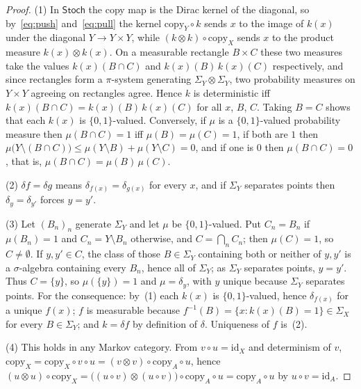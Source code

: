 \documentclass[11pt,a4paper]{article}
\theoremstyle{plain}
\theoremstyle{definition}
\theoremstyle{remark}
\newcommand{\cat}[1]{\mathsf{#1}}
\newcommand{\Stoch}{\cat{Stoch}}
\newcommand{\id}{\mathrm{id}}
\newcommand{\del}{\delta}
\begin{document}
\begin{proof}
(1) In $\Stoch$ the copy map is the Dirac kernel of the diagonal, so
by~\eqref{eq:push} and~\eqref{eq:pull} the kernel $\mathrm{copy}_Y \circ k$
sends $x$ to the image of $k(x)$ under the diagonal $Y \to Y \times Y$, while
$(k \otimes k) \circ \mathrm{copy}_X$ sends $x$ to the product measure
$k(x) \otimes k(x)$. On a measurable rectangle $B \times C$ these two
measures take the values $k(x)(B \cap C)$ and $k(x)(B)\,k(x)(C)$
respectively, and since rectangles form a $\pi$-system generating
$\Sigma_Y \otimes \Sigma_Y$, two probability measures on $Y \times Y$ agreeing
on rectangles agree. Hence $k$ is deterministic iff
$k(x)(B \cap C) = k(x)(B)\,k(x)(C)$ for all $x$, $B$, $C$. Taking $B = C$
shows that each $k(x)$ is $\{0,1\}$-valued. Conversely, if $\mu$ is a
$\{0,1\}$-valued probability measure then $\mu(B \cap C) = 1$ iff
$\mu(B) = \mu(C) = 1$, if both are $1$ then
$\mu\bigl(Y \setminus (B \cap C)\bigr) \le \mu(Y \setminus B) + \mu(Y
\setminus C) = 0$, and if one is $0$ then $\mu(B \cap C) = 0$, that is,
$\mu(B \cap C) = \mu(B)\,\mu(C)$.

(2) $\del f = \del g$ means $\delta_{f(x)} = \delta_{g(x)}$ for every $x$,
and if $\Sigma_Y$ separates points then $\delta_y = \delta_{y'}$ forces
$y = y'$.

(3) Let $(B_n)_{n}$ generate $\Sigma_Y$ and let $\mu$ be $\{0,1\}$-valued.
Put $C_n = B_n$ if $\mu(B_n) = 1$ and $C_n = Y \setminus B_n$ otherwise, and
$C = \bigcap_n C_n$; then $\mu(C) = 1$, so $C \neq \emptyset$. If
$y, y' \in C$, the class of those $B \in \Sigma_Y$ containing both or neither
of $y, y'$ is a $\sigma$-algebra containing every $B_n$, hence all of
$\Sigma_Y$; as $\Sigma_Y$ separates points, $y = y'$. Thus $C = \{y\}$, so
$\mu(\{y\}) = 1$ and $\mu = \delta_y$, with $y$ unique because $\Sigma_Y$
separates points. For the consequence: by~(1) each $k(x)$ is
$\{0,1\}$-valued, hence $\delta_{f(x)}$ for a unique $f(x)$; $f$ is
measurable because $f^{-1}(B) = \{x : k(x)(B) = 1\} \in \Sigma_X$ for every
$B \in \Sigma_Y$; and $k = \del f$ by definition of $\del$. Uniqueness of $f$
is~(2).

(4) This holds in any Markov category. From $v \circ u = \id_X$ and
determinism of $v$,
$\mathrm{copy}_X = \mathrm{copy}_X \circ v \circ u = (v \otimes v) \circ
\mathrm{copy}_A \circ u$, hence
$(u \otimes u) \circ \mathrm{copy}_X = \bigl((u \circ v) \otimes (u \circ
v)\bigr) \circ \mathrm{copy}_A \circ u = \mathrm{copy}_A \circ u$ by
$u \circ v = \id_A$.
\end{proof}
\end{document}
